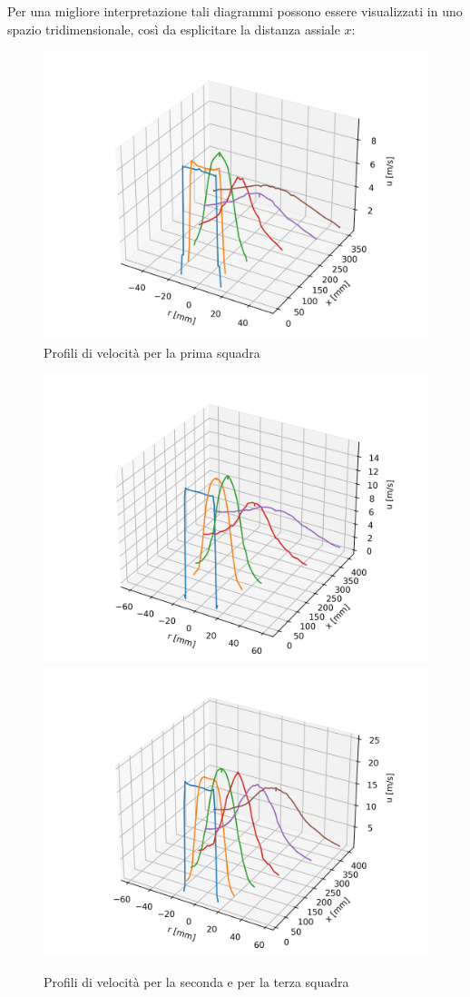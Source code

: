 \noindent Per una migliore interpretazione tali diagrammi possono essere visualizzati in uno spazio tridimensionale, così da esplicitare la distanza assiale $x$:
\begin{figure}[H]
    \centering
    \includegraphics[width=.8\textwidth]{images/3/sq13d.png}
    \caption{Profili di velocità per la prima squadra}
\end{figure}
\begin{figure}[H]
    \centering
    \includegraphics[width=.92\textwidth]{images/3/sq23d.png}
    \includegraphics[width=.92\textwidth]{images/3/sq33d.png}
    \caption{Profili di velocità per la seconda e per la terza squadra}
\end{figure}
